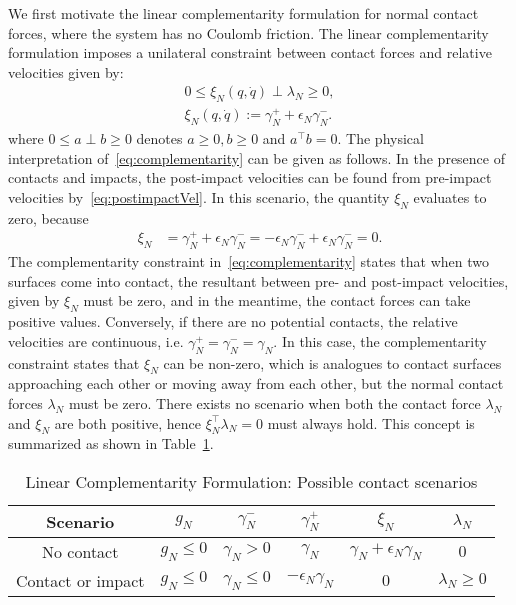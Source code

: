 We first motivate the linear complementarity formulation for normal contact
forces, where the system has no Coulomb friction.
% 
The linear complementarity formulation imposes a unilateral constraint between
contact forces and relative velocities given by:
\begin{equation}
  \begin{gathered}
    0 \leq 
      \xi_N(q, \dot{q}) 
      \perp
      \lambda_N  
      \geq 0, \\
      \xi_N(q, \dot{q}) := \gamma_N^+ + \epsilon_N \gamma_N^-.
  \end{gathered}
  \label{eq:complementarity} 
\end{equation}
\noindent where $0 \leq a \perp b \geq 0$ denotes $a \geq 0, b \geq 0$ and
$a^\top b=0$.
% 
The physical interpretation of~\eqref{eq:complementarity} can be given as
follows.
%
%
In the presence of contacts and impacts, the post-impact velocities can be found
from pre-impact velocities by~\eqref{eq:postimpactVel}.
%
In this scenario, the quantity $\xi_N$ evaluates to zero, because
\begin{align*}
  \xi_N &= \gamma_N^+ + \epsilon_N \gamma_N^- = -\epsilon_N \gamma_N^- + \epsilon_N \gamma_N^- = 0.
\end{align*}
%
The complementarity constraint in~\eqref{eq:complementarity} states that when
two surfaces come into contact, the resultant between pre- and post-impact
velocities, given by $\xi_N$ must be zero, and in the meantime, the contact
forces can take positive values.
%
Conversely, if there are no potential contacts, the relative velocities are
continuous, i.e. $\gamma_N^+ = \gamma_N^- = \gamma_N$.
%
In this case, the complementarity constraint states that $\xi_N$ can be
non-zero, which is analogues to contact surfaces approaching each other or
moving away from each other, but the normal contact forces $\lambda_N$ must be
zero. 
%
There exists no scenario when both the contact force $\lambda_N$ and $\xi_N$ are
both positive, hence $\xi_N^\top \lambda_N = 0$ must always hold.
%
This concept is summarized as shown in Table~\ref{tab:complementarity}.

\begin{table}[tb]
  \centering
  \caption{Linear Complementarity Formulation: Possible contact scenarios}
  \begin{tabular}{|c|c|c|c|c|c|}
    \hline
    Scenario & $g_N$ & $\gamma_N^-$ & $\gamma_N^+$ & $\xi_N$ & $\lambda_N$ \\
    \hline\hline
    No contact & $g_N \leq 0$  & $\gamma_N > 0$ & $\gamma_N$ & $ \gamma_N +\epsilon_N\gamma_N$ & $0$ \\
    Contact or impact & $g_N \leq 0$ &  $\gamma_N \leq 0$ & $- \epsilon_N \gamma_N$ & $0$ & $\lambda_N \geq 0$ \\
    \hline
  \end{tabular}
  \label{tab:complementarity}
\end{table}

